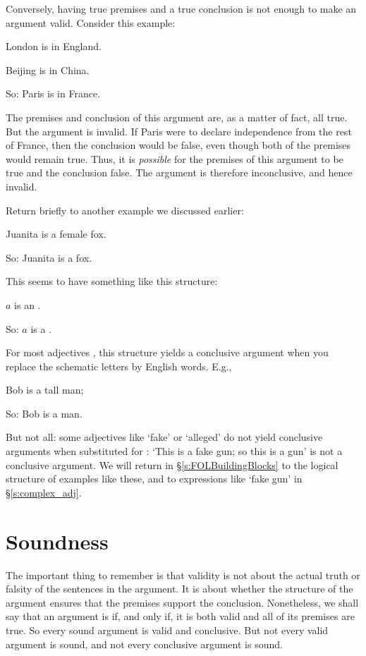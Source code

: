 Conversely, having true premises and a true conclusion is not enough to make an argument valid. Consider this example:
	\begin{earg}
		\item[] London is in England.
		\item[] Beijing is in China.
		\item[So:] Paris is in France.
	\end{earg}
The premises and conclusion of this argument are, as a matter of fact, all true. But the argument is invalid. If Paris were to declare independence from the rest of France, then the conclusion would be false, even though both of the premises would remain true. Thus, it is \emph{possible} for the premises of this argument to be true and the conclusion false. The argument is therefore inconclusive, and hence invalid.

Return briefly to another example we discussed earlier: \begin{earg}
 		\item[] Juanita is a female fox.
 		\item[So:] Juanita is a fox.
 	\end{earg} This seems to have something like this structure:
\begin{earg}
 		\item[] $a$ is an \; .
 		\item[So:] $a$ is a .
 	\end{earg} For most adjectives , this structure yields a conclusive argument when you replace the schematic letters by English words. E.g., \begin{earg}
 		\item[] Bob is a tall man;
 		\item[So:] Bob is a man.
 	\end{earg} But not all: some adjectives like `fake' or `alleged' do not yield conclusive arguments when substituted for : `This is a fake gun; so this is a gun' is not a conclusive argument. We will return in §\ref{s:FOLBuildingBlocks} to the logical structure of examples like these, and to expressions like `fake gun' in §\ref{s:complex_adj}.


\section{Soundness}\label{s:sound}

The important thing to remember is that validity is not about the actual truth or falsity of the sentences in the argument. It is about whether the structure of the argument ensures that the premises support the conclusion. Nonetheless, we shall say that an argument is  if, and only if, it is both valid and all of its premises are true. So every sound argument is valid and conclusive. But not every valid argument is sound, and not every conclusive argument is sound.


